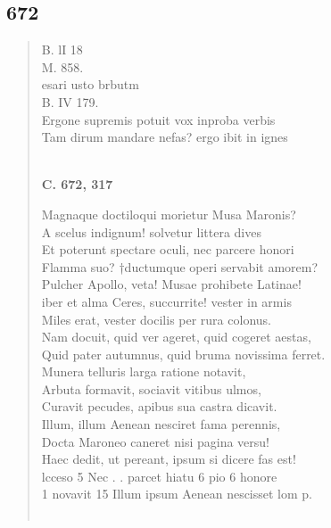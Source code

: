 \documentclass[11pt, a4paper]{report}
\begin{document}
            \subsection*{672}
      \begin{verse}
      B. lI 18 \\ M. 858. \\ esari usto brbutm \\ B. IV 179. \\ Ergone supremis potuit vox inproba verbis \\ Tam dirum mandare nefas? ergo ibit in ignes \\ 
        ﻿\pagebreak 
     \marginpar{[146]} \begin{center} \textbf{C. 672, 317} \end{center}Magnaque doctiloqui morietur Musa Maronis? \\ A scelus indignum! solvetur littera dives \\ Et poterunt spectare oculi, nec parcere honori \\ Flamma suo? †ductumque operi servabit amorem? \\ Pulcher Apollo, veta! Musae prohibete Latinae! \\ iber et alma Ceres, succurrite! vester in armis \\ Miles erat, vester docilis per rura colonus. \\ Nam docuit, quid ver ageret, quid cogeret aestas, \\ Quid pater autumnus, quid bruma novissima ferret. \\ Munera telluris larga ratione notavit, \\ Arbuta formavit, sociavit vitibus ulmos, \\ Curavit pecudes, apibus sua castra dicavit. \\ Illum, illum Aenean nesciret fama perennis, \\ Docta Maroneo caneret nisi pagina versu! \\ Haec dedit, ut pereant, ipsum si dicere fas est! \\ lcceso 5 Nec . . parcet hiatu 6 pio 6 honore \\ 1 novavit 15 Illum ipsum Aenean nescisset lom p. \\ 
        ﻿\pagebreak 

\end{verse}
\end{document}
